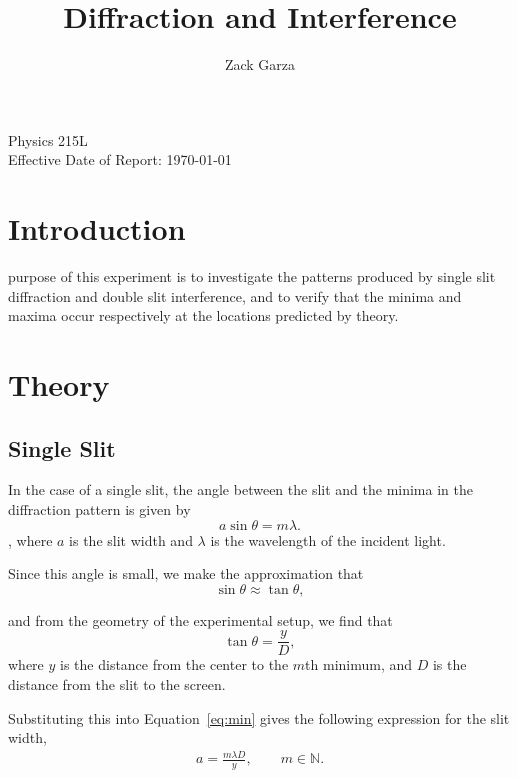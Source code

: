 \documentclass[twocolumn,english]{IEEEtran}
\theoremstyle{plain}
\theoremstyle{plain}
\begin{document}
\title{Diffraction and Interference}


\author{Zack Garza}


\IEEEspecialpapernotice
{Physics 215L \\
Effective Date of Report: \today }


\maketitle


\tableofcontents

\section{Introduction}
 purpose of this experiment is to investigate the patterns produced by single slit diffraction and double slit interference, and to verify that the minima and maxima occur respectively at the locations predicted by theory.

\section{Theory}
\subsection{Single Slit}
In the case of a single slit, the angle  between the slit and the minima in the diffraction pattern is given by
\begin{equation}\label{eq:min}
	a\sin\theta = m\lambda.
\end{equation}
, where $a$ is the slit width and $\lambda$ is the wavelength of the incident light.

Since this angle is small, we make the approximation that
\begin{equation*}
	\sin\theta \approx \tan\theta,
\end{equation*}

and from the geometry of the experimental setup, we find that
\begin{equation*}
	\tan\theta = \frac{y}{D},
\end{equation*}
where $y$ is the distance from the center to the $m$th minimum, and $D$ is the distance from the slit to the screen.

Substituting this into Equation~\ref{eq:min} gives the following expression for the slit width,
\begin{align}\label{eq:single_slit_width}
	a = \frac{m\lambda D}{y}, \qquad  m\in\mathbb{N}.
\end{align}
\end{document}
